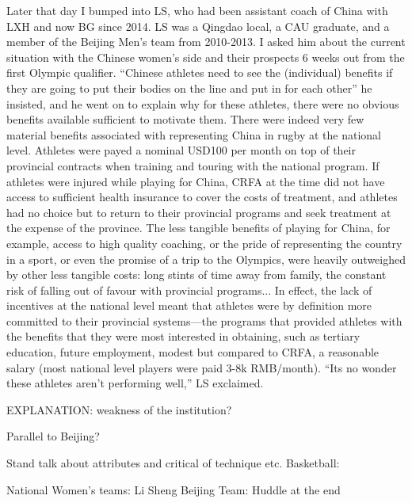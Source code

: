 Later that day I bumped into LS, who had been assistant coach of China with LXH and now BG since 2014.  LS was a Qingdao local, a CAU graduate, and a member of the Beijing Men's team from 2010-2013.  I asked him about the current situation with the Chinese women's side and their prospects 6 weeks out from the first Olympic qualifier.  ``Chinese athletes need to see the (individual) benefits if they are going to put their bodies on the line and put in for each other'' he insisted, and he went on to explain why for these athletes, there were no obvious benefits available sufficient to motivate them.  There were indeed very few material benefits associated with representing China in rugby at the national level.  Athletes were payed a nominal USD100 per month on top of their provincial contracts when training and touring with the national program.  If athletes were injured while playing for China, CRFA at the time did not have access to sufficient health insurance to cover the costs of treatment, and athletes had no choice but to return to their provincial programs and seek treatment at the expense of the province.  The less tangible benefits of playing for China, for example, access to high quality coaching, or the pride of representing the country in a sport, or even the promise of a trip to the Olympics, were heavily outweighed by other less tangible costs: long stints of time away from family, the constant risk of falling out of favour with provincial programs...  In effect, the lack of incentives at the national level meant that athletes were by definition more committed to their provincial systems---the programs that provided athletes with the benefits that they were most interested in obtaining, such as tertiary education, future employment, modest but compared to CRFA, a reasonable salary (most national level players were paid 3-8k RMB/month). ``Its no wonder these athletes aren't performing well,'' LS exclaimed.

EXPLANATION: weakness of the institution?

Parallel to Beijing?


Stand talk about attributes and critical of technique etc.
Basketball:



National Women's teams: Li Sheng
Beijing Team: Huddle at the end




















